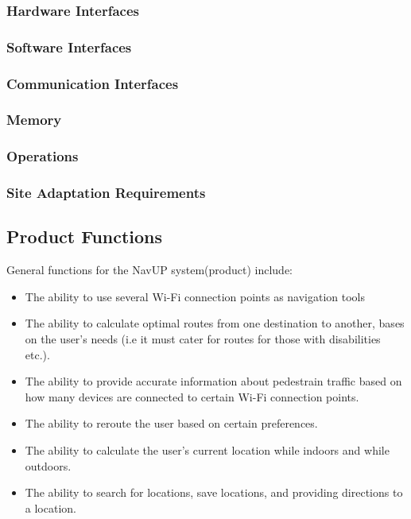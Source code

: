 \documentclass{article}
\begin{document}
        \subsubsection{Hardware Interfaces}
        \subsubsection{Software Interfaces}
        \subsubsection{Communication Interfaces}
        \subsubsection{Memory}
        \subsubsection{Operations}
        \subsubsection{Site Adaptation Requirements}
    \subsection{Product Functions}
		\begin{flushleft}
			General functions for the NavUP system(product) include:
			\begin{itemize}
   		 	\item The ability to use several Wi-Fi connection points as navigation tools
			 	\item The ability to calculate optimal routes from one destination to another, bases on the user's needs (i.e it must cater for routes for those with disabilities etc.).
			 	\item The ability to provide accurate information about pedestrain traffic based on how many devices are connected to certain Wi-Fi connection points.
				 \item The ability to reroute the user based on certain preferences.
				 \item The ability to calculate the user's current location while indoors and while outdoors.
				 \item The ability to search for locations, save locations, and providing directions to a location. 
			\end{itemize}
		\end{flushleft}
\end{document}

